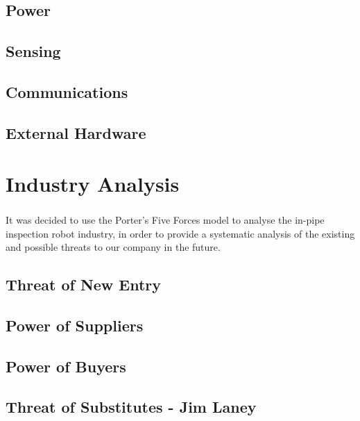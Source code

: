 \documentclass[11pt]{article}		%
\begin{document}
		\subsection{Power}
		
		\subsection{Sensing}
		
		\subsection{Communications}
		
		\subsection{External Hardware}
			
	\section{Industry Analysis}
		
		It was decided to use the Porter's Five Forces model\textsuperscript{\cite{porter2008five}} to analyse the in-pipe inspection robot industry, in order to provide a systematic analysis of the existing and possible threats to our company in the future.
		
		\subsection[Threat of Entry]{Threat of New Entry}
				
		\subsection[Power of Suppliers]{Power of Suppliers}
		
		\subsection[Power of Buyers]{Power of Buyers}
		
		\subsection[Threat of Substitutes]{Threat of Substitutes - Jim Laney}
			
\end{document}
